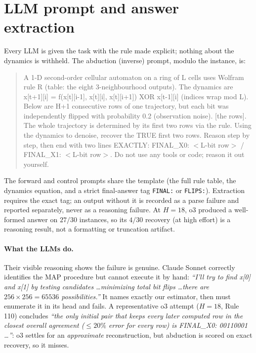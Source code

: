 \documentclass{article}
\begin{document}


\appendix
\section{LLM prompt and answer extraction}
\label{app:prompts}

Every LLM is given the task with the rule made explicit; nothing about the dynamics is withheld. The
abduction (inverse) prompt, modulo the instance, is:

\begin{quote}\small\ttfamily
A 1-D second-order cellular automaton on a ring of L cells uses Wolfram rule R (table: the eight
3-neighbourhood outputs). The dynamics are x[t+1][i] = f(x[t][i-1], x[t][i], x[t][i+1]) XOR x[t-1][i]
(indices wrap mod L). Below are H+1 consecutive rows of one trajectory, but each bit was independently
flipped with probability 0.2 (observation noise). [the rows]. The whole trajectory is determined by
its first two rows via the rule. Using the dynamics to denoise, recover the TRUE first two rows.
Reason step by step, then end with two lines EXACTLY: FINAL\_X0: $<$L-bit row$>$ / FINAL\_X1:
$<$L-bit row$>$. Do not use any tools or code; reason it out yourself.
\end{quote}

The forward and control prompts share the template (the full rule table, the dynamics equation, and a
strict final-answer tag \texttt{FINAL:} or \texttt{FLIPS:}). Extraction requires the exact tag; an
output without it is recorded as a parse failure and reported separately, never as a reasoning
failure. At $H=18$, o3 produced a well-formed answer on $27/30$ instances, so its $4/30$ recovery (at
high effort) is a reasoning result, not a formatting or truncation artifact.

\paragraph{What the LLMs do.}
Their visible reasoning shows the failure is genuine. Claude Sonnet correctly identifies the MAP
procedure but cannot execute it by hand: \emph{``I'll try to find x[0] and x[1] by testing candidates
\dots minimizing total bit flips \dots there are $256\times256 = 65536$ possibilities.''} It names
exactly our estimator, then must enumerate it in its head and fails. A representative o3 attempt
($H=18$, Rule 110) concludes \emph{``the only initial pair that keeps every later computed row in the
closest overall agreement ($\le 20\%$ error for every row) is FINAL\_X0: 00110001 \dots''}: o3 settles
for an \emph{approximate} reconstruction, but abduction is scored on exact recovery, so it misses.
\end{document}
